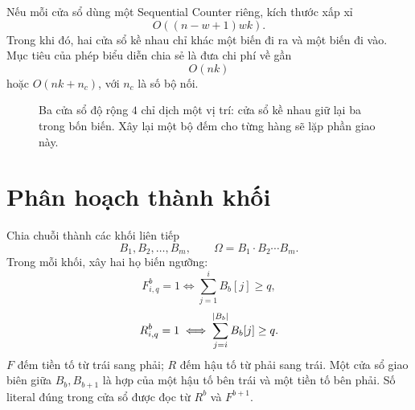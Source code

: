 Nếu mỗi cửa sổ dùng một Sequential Counter riêng, kích thước xấp xỉ
\[
  O((n-w+1)wk).
\]
Trong khi đó, hai cửa sổ kề nhau chỉ khác một biến đi ra và một biến đi vào.
Mục tiêu của phép biểu diễn chia sẻ là đưa chi phí về gần
\[
  O(nk)
\]
hoặc \(O(nk+n_c)\), với \(n_c\) là số bộ nối.

\begin{figure}[tb]
\centering
{}
\caption{Ba cửa sổ độ rộng \(4\) chỉ dịch một vị trí: cửa sổ kề nhau giữ lại
ba trong bốn biến. Xây lại một bộ đếm cho từng hàng sẽ lặp phần giao này.}
\label{fig:overlapping-windows}
\end{figure}

\section{Phân hoạch thành khối}

Chia chuỗi thành các khối liên tiếp
\[
  B_1,B_2,\ldots,B_m,
  \qquad
  \Omega=B_1\cdot B_2\cdots B_m.
\]
Trong mỗi khối, xây hai họ biến ngưỡng:
\[
  F^b_{i,q}=1
  \iff
  \sum_{j=1}^{i}B_b[j]\ge q,
\]
\[
  R^b_{i,q}=1
  \iff
  \sum_{j=i}^{\lvert B_b\rvert}B_b[j]\ge q.
\]
\(F\) đếm tiền tố từ trái sang phải; \(R\) đếm hậu tố từ phải sang trái. Một
cửa sổ giao biên giữa \(B_b,B_{b+1}\) là hợp của một hậu tố bên trái và một
tiền tố bên phải. Số literal đúng trong cửa sổ được đọc từ \(R^b\) và
\(F^{b+1}\).

